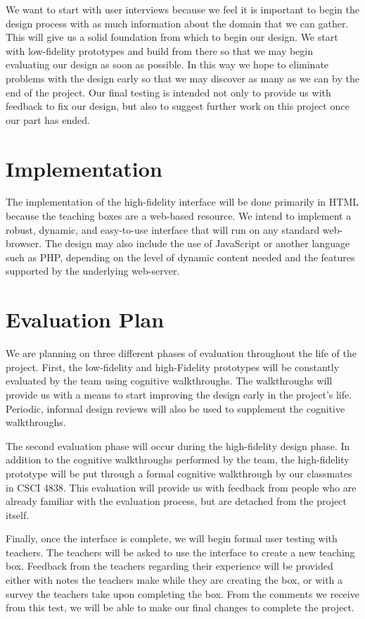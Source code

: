 \documentclass[12pt,titlepage]{article}
\begin{document}
We want to start with user interviews because we feel it is important to begin
the design process with as much information about the domain that we can gather.
This will give us a solid foundation from which to begin our design. We start
with low-fidelity prototypes and build from there so that we may begin
evaluating our design as soon as possible. In this way we hope to eliminate
problems with the design early so that we may discover as many as we can by the
end of the project. Our final testing is intended not only to provide us with
feedback to fix our design, but also to suggest further work on this project
once our part has ended.

\section{Implementation}
The implementation of the high-fidelity interface will be done primarily in HTML
because the teaching boxes are a web-based resource.  We intend to implement a
robust, dynamic, and easy-to-use interface that will run on any standard
web-browser.  The design may also include the use of JavaScript or another
language such as PHP, depending on the level of dynamic content needed and the
features supported by the underlying web-server.

\section{Evaluation Plan}
We are planning on three different phases of evaluation throughout the life of
the project. First, the low-fidelity and high-Fidelity prototypes will be
constantly evaluated by the team using cognitive walkthroughs. The walkthroughs
will provide us with a means to start improving the design early in the
project's life. Periodic, informal design reviews will also be used to
supplement the cognitive walkthroughs.

The second evaluation phase will occur during the high-fidelity design phase.
In addition to the cognitive walkthroughs performed by the team, the
high-fidelity prototype will be put through a formal cognitive walkthrough by
our classmates in CSCI 4838. This evaluation will provide us with feedback from
people who are already familiar with the evaluation process, but are detached
from the project itself.

Finally, once the interface is complete, we will begin formal user testing with
teachers. The teachers will be asked to use the interface to create a new
teaching box. Feedback from the teachers regarding their experience will be
provided either with notes the teachers make while they are creating the box, or
with a survey the teachers take upon completing the box. From the comments we
receive from this test, we will be able to make our final changes to complete
the project.
\end{document}
